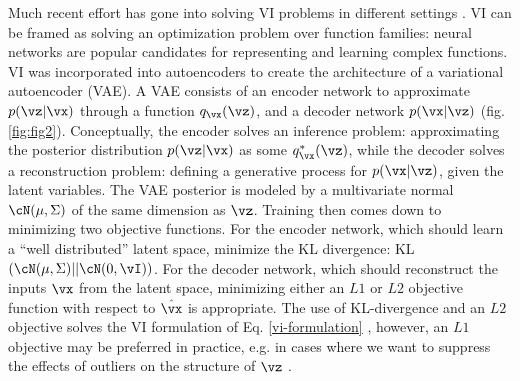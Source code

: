 Much recent effort has gone into solving VI problems in different settings \citep{Zhang2019,
Ingraham2017, Bouchard-Cote2010}. VI can be framed as solving an optimization problem over function
families: neural networks are popular candidates for representing and learning complex functions. VI
was incorporated into autoencoders \citep{Kingma2014} to create the architecture of a variational
autoencoder (VAE). A VAE consists of an encoder network to approximate $p(\vz|\vx)$ through a
function $q_\vx(\vz)$, and a decoder network $p(\vx|\vz)$ (fig. \ref{fig:fig2}). Conceptually, the encoder solves an inference problem: approximating the posterior distribution $p(\vz|\vx)$ as some $q^*_\vx(\vz)$, while the decoder solves a reconstruction problem: defining a generative process for $p(\vx|\vz)$, given the latent variables.
The VAE posterior is modeled by a multivariate normal $\cN(\mathbf{\mu},\Sigma)$ of the same dimension as $\vz$. Training then comes down to minimizing two objective functions. For the encoder network, which should learn a ``well distributed'' latent space, minimize the KL divergence: KL$(\cN(\mathbf{\mu},\Sigma) || \cN(0,\vI)) $. For the decoder network, which should reconstruct the inputs $\vx$ from the latent space, minimizing either an $L1$ or $L2$ objective function with respect to $\hat{\vx}$ is appropriate. The use of KL-divergence and an $L2$ objective solves the VI formulation of Eq. \ref{vi-formulation} \citep{Kingma2014}, however, an $L1$ objective may be preferred in practice, e.g. in cases where we want to suppress the effects of outliers on the structure of $\vz$ \citep{botchkarev2018performance}.





